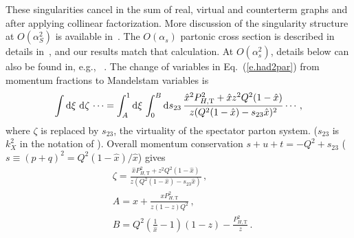 \documentclass[prd,preprintnumbers,nofootinbib,superscriptaddress,onecolumn,preprint]{revtex4-1}
\newcommand\3[1]{\boldsymbol{#1}}
\newcommand{\Tsc}[2]{#1_{#2\text{T}}}
\newcommand{\eref}[1]{Eq.~(\ref{e.#1})}
\begin{document}
These singularities cancel in the sum of real, virtual and counterterm
graphs and after applying collinear factorization. More discussion of
the singularity structure at $O(\alpha_S^2)$ is available
in~\cite{Daleo:2004pn,Arnold:1988dp}.  The $O(\alpha_s)$ partonic
cross section is described in details in~\cite{Nadolsky:1999kb}, and
our results match that calculation. At $O(\alpha_s^2)$, details below
can also be found in, e.g.,
~\cite{Aversa:1988vb,Gordon:1993qc,Ellis:1979sj,Ellis:1981hk,Arnold:1988dp}.  
%
The change of variables in \eref{had2par}
from momentum fractions to Mandelstam variables is
%
\begin{align}
\int \diff{\xi}{} \diff{\zeta}{}  \cdots 
=\int_A^1 \diff{\xi}{} \int_0^B \diff{s_{23}}{} 
 \frac{\hat{x}^2\Tsc{P}{H,}^2+\hat{x}z^2Q^2(1-\hat{x})}
      {z(Q^2(1-\hat{x})-s_{23}\hat{x})^2} 
\cdots \, ,
\label{e.hdxsc}
\end{align}
%
where $\zeta$ is replaced by $s_{23}$, the virtuality of the spectator
parton system.  ($s_{23}$ is $k_X^2$ in the notation of 
\cite{Gonzalez-Hernandez:2018ipj}). Overall momentum conservation
$s+u+t=-Q^2+s_{23}$ ($s\equiv (p+q)^2=Q^2(1-\hat{x})/\hat{x}$) gives
%
\begin{align}
&\zeta=\frac{\hat{x}\Tsc{P}{H,}^2+z^2Q^2(1-\hat{x})}{z(Q^2(1-\hat{x})-s_{23}\hat{x})} 
\label{e.zeta2xz}\, , \\
&A=x+\frac{x\Tsc{P}{H,}^2}{z(1-z)Q^2} \, , \\
&B=Q^2\left (\frac{1}{\hat{x}}-1 \right) (1-z)-\frac{\Tsc{P}{H,}^2}{z} \, .
\label{e.limitsA}
\end{align}
%
\end{document}
